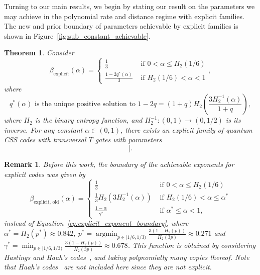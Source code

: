 \documentclass{article}
\newtheorem{theorem}{Theorem}
\newcounter{main}[section]
\newtheorem{remark}[main]{Remark}
\DeclareMathOperator{\argmin}{argmin}
\begin{document}
Turning to our main results, we begin by stating our result on the parameters we may achieve in the polynomial rate and distance regime with explicit families. The new and prior boundary of parameters achievable by explicit families is shown in Figure~\ref{fig:sub_constant_achievable}.
\begin{theorem}\label{thm:sub_constant_explicit}
    Consider\begin{equation}\label{eq:explicit_exponent_boundary}
    \beta_{\text{explicit}}(\alpha) = \begin{cases}
        \frac{1}{3} &\text{ if } 0 < \alpha \leq H_2(1/6)\\
        \frac{1-2q^*(\alpha)}{3} &\text{ if } H_2(1/6) < \alpha < 1
    \end{cases},
\end{equation}
where
\begin{equation}
    q^*(\alpha)\text{ is the unique positive solution to }1-2q = (1+q)H_2\left(\frac{3H_2^{-1}(\alpha)}{1+q}\right),
\end{equation}
    where $H_2$ is the binary entropy function, and $H_2^{-1}: (0,1) \to (0,1/2)$ is its inverse. For any constant $\alpha \in (0,1)$, there exists an explicit family of quantum CSS codes with transversal $T$ gates with parameters 
    \begin{equation}
        [[n,\Omega(n^{\alpha+o(1)}), \Omega(n^{\beta_{\text{explicit}}(\alpha)+ o(1)})]].
    \end{equation}
\end{theorem}
\begin{remark}\label{rmk:explicit_old_sub_constant}
    Before this work, the boundary of the achievable exponents for explicit codes was given by
    \begin{equation}
        \beta_{\text{explicit, old}}(\alpha) = \begin{cases}
            \frac{1}{3} &\text{ if } 0<\alpha \leq H_2(1/6)\\
            \frac{1}{3}H_2(3H_2^{-1}(\alpha)) &\text{ if }H_2(1/6) < \alpha \leq \alpha^*\\
            \frac{1-\alpha}{\gamma^*} &\text{ if } \alpha^* \leq \alpha < 1,
        \end{cases}
    \end{equation}
    instead of Equation~\eqref{eq:explicit_exponent_boundary}, where $\alpha^* = H_2(p^*) \approx 0.842$, $p^* = \argmin_{p \in [1/6,1/3)}\frac{3(1-H_2(p))}{H_2(3p)} \approx 0.271$ and $\gamma^* = \min_{p \in [1/6,1/3)}\frac{3(1-H_2(p))}{H_2(3p)} \approx 0.678$. This function is obtained by considering Hastings and Haah's codes~\cite{hastings2018distillation}, and taking polynomially many copies thereof. Note that Haah's codes~\cite{haah2018towers} are not included here since they are not explicit.
\end{remark}
\end{document}
